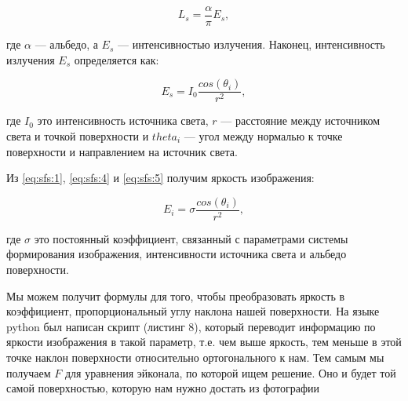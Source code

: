 \documentclass[a4paper,12pt]{article}
\begin{document}
\begin{equation}
  \label{eq:sfs:4}
  L_s=\frac{\alpha}{\pi}E_s,
\end{equation}

где $\alpha$ --- альбедо, а $E_s$ --- интенсивностью
излучения. Наконец, интенсивность излучения $E_s$ определяется как:

\begin{equation}
  \label{eq:sfs:5}
  E_s = I_0\frac{cos(\theta_i)}{r^2},
\end{equation}

где $I_0$ это интенсивность источника света, $r$ --- расстояние между
источником света и точкой поверхности и $theta_i$ --- угол между
нормалью к точке поверхности и направлением на источник света.

Из \eqref{eq:sfs:1}, \eqref{eq:sfs:4} и \eqref{eq:sfs:5} получим яркость
изображения:

\begin{equation}
  \label{eq:sfs:6}
  E_i = \sigma\frac{cos(\theta_i)}{r^2},
\end{equation}

где $\sigma$ это постоянный коэффициент, связанный с параметрами
системы формирования изображения, интенсивности источника света и
альбедо поверхности.

Мы можем получит формулы для того, чтобы преобразовать яркость в
коэффициент, пропорциональный углу наклона нашей поверхности.  На
языке python был написан скрипт (листинг 8), который переводит
информацию по яркости изображения в такой параметр, т.е. чем выше
яркость, тем меньше в этой точке наклон поверхности относительно
ортогонального к нам. Тем самым мы получаем $F$ для уравнения
эйконала, по которой ищем решение. Оно и будет той самой поверхностью,
которую нам нужно достать из фотографии
\end{document}

